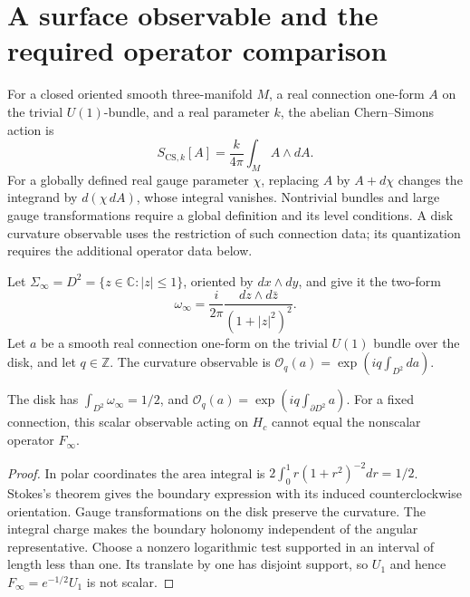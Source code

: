 \section{A surface observable and the required operator comparison}
For a closed oriented smooth three-manifold \(M\), a real connection
one-form \(A\) on the trivial \(U(1)\)-bundle, and a real parameter \(k\),
the abelian Chern--Simons action is
\begin{equation}
 S_{\mathrm{CS},k}[A]=\frac{k}{4\pi}\int_M A\wedge dA.
 \label{v4-arith:w9-r2:eq:CS-action}
\end{equation}
For a globally defined real gauge parameter \(\chi\), replacing \(A\)
by \(A+d\chi\) changes the integrand by \(d(\chi\,dA)\), whose integral
vanishes. Nontrivial bundles and large gauge transformations require
a global definition and its level conditions.
A disk curvature observable uses the restriction of such connection
data; its quantization requires the additional operator data below.

\begin{definition}
\label{v4-arith:w9-r2:def:Sigma-infty}
Let $\Sigma_\infty=D^2=\{z\in\mathbb C:|z|\le1\}$, oriented by
$dx\wedge dy$, and give it the two-form
\[
 \omega_\infty=\frac{i}{2\pi}
              \frac{dz\wedge d\bar z}{(1+|z|^2)^2}.
\]
Let $a$ be a smooth real connection one-form on the trivial $U(1)$
bundle over the disk, and let $q\in\mathbb Z$.
The curvature observable is
$\mathcal O_q(a)=\exp(iq\int_{D^2}da)$.
\end{definition}

\begin{proposition}
The disk has $\int_{D^2}\omega_\infty=1/2$, and
$\mathcal O_q(a)=\exp(iq\int_{\partial D^2}a)$.
For a fixed connection, this scalar observable acting on $H_c$
cannot equal the nonscalar operator $F_\infty$.
\end{proposition}
\begin{proof}
In polar coordinates the area integral is
$2\int_0^1 r(1+r^2)^{-2}dr=1/2$.
Stokes's theorem gives the boundary expression with its induced
counterclockwise orientation. Gauge transformations on the disk
preserve the curvature. The integral charge makes the boundary
holonomy independent of the angular representative.
Choose a nonzero logarithmic test supported in an interval of length
less than one. Its translate by one has disjoint support, so $U_1$
and hence $F_\infty=e^{-1/2}U_1$ is not scalar.
\end{proof}

